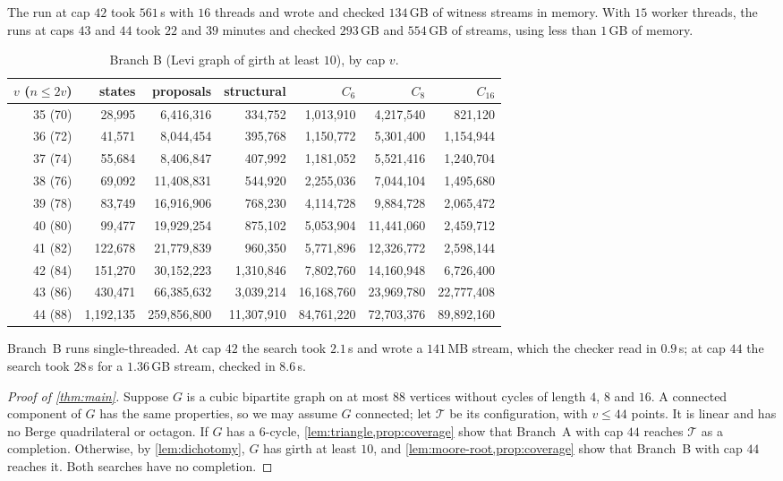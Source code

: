\documentclass[11pt]{amsart}
\theoremstyle{definition}
\theoremstyle{remark}
\begin{document}
The run at cap $42$ took $561$\,s with $16$ threads and wrote and checked
$134$\,GB of witness streams in memory. With $15$ worker threads, the runs at
caps $43$ and $44$ took $22$ and $39$ minutes and checked $293$\,GB and
$554$\,GB of streams, using less than $1$\,GB of memory.

\begin{table}[ht]
\centering
\small
\caption{Branch B (Levi graph of girth at least $10$), by cap $v$.}
\label{tab:branchB}
\begin{tabular}{@{}rrrrrrr@{}}
\toprule
$v$ ($n\le 2v$) & states & proposals & structural & $C_6$ & $C_8$ & $C_{16}$\\
\midrule
35 (70) & 28{,}995 & 6{,}416{,}316 & 334{,}752 & 1{,}013{,}910 & 4{,}217{,}540 & 821{,}120\\
36 (72) & 41{,}571 & 8{,}044{,}454 & 395{,}768 & 1{,}150{,}772 & 5{,}301{,}400 & 1{,}154{,}944\\
37 (74) & 55{,}684 & 8{,}406{,}847 & 407{,}992 & 1{,}181{,}052 & 5{,}521{,}416 & 1{,}240{,}704\\
38 (76) & 69{,}092 & 11{,}408{,}831 & 544{,}920 & 2{,}255{,}036 & 7{,}044{,}104 & 1{,}495{,}680\\
39 (78) & 83{,}749 & 16{,}916{,}906 & 768{,}230 & 4{,}114{,}728 & 9{,}884{,}728 & 2{,}065{,}472\\
40 (80) & 99{,}477 & 19{,}929{,}254 & 875{,}102 & 5{,}053{,}904 & 11{,}441{,}060 & 2{,}459{,}712\\
41 (82) & 122{,}678 & 21{,}779{,}839 & 960{,}350 & 5{,}771{,}896 & 12{,}326{,}772 & 2{,}598{,}144\\
42 (84) & 151{,}270 & 30{,}152{,}223 & 1{,}310{,}846 & 7{,}802{,}760 & 14{,}160{,}948 & 6{,}726{,}400\\
43 (86) & 430{,}471 & 66{,}385{,}632 & 3{,}039{,}214 & 16{,}168{,}760 & 23{,}969{,}780 & 22{,}777{,}408\\
44 (88) & 1{,}192{,}135 & 259{,}856{,}800 & 11{,}307{,}910 & 84{,}761{,}220 & 72{,}703{,}376 & 89{,}892{,}160\\
\bottomrule
\end{tabular}
\end{table}

Branch~B runs single-threaded. At cap $42$ the search took $2.1$\,s and wrote a
$141$\,MB stream, which the checker read in $0.9$\,s; at cap $44$ the search
took $28$\,s for a $1.36$\,GB stream, checked in $8.6$\,s.

\FloatBarrier
\begin{proof}[Proof of \cref{thm:main}]
Suppose $G$ is a cubic bipartite graph on at most $88$ vertices without cycles of
length $4$, $8$ and $16$. A connected component of $G$ has the same properties,
so we may assume $G$ connected; let $\mathcal T$ be its configuration, with
$v\le 44$ points. It is linear and has no Berge quadrilateral or octagon. If $G$
has a $6$-cycle, \cref{lem:triangle,prop:coverage} show that Branch~A with cap
$44$ reaches $\mathcal T$ as a completion. Otherwise, by \cref{lem:dichotomy},
$G$ has girth at least $10$, and \cref{lem:moore-root,prop:coverage} show that
Branch~B with cap $44$ reaches it. Both searches have no completion.
\end{proof}
\end{document}
